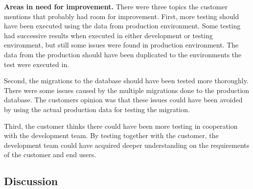 \textbf{Areas in need for improvement.} There were three topics the customer mentions that probably had room for improvement. First, more testing should have been executed using the data from production environment. Some testing had successive results when executed in either development or testing environment, but still some issues were found in production environment. The data from the production should have been duplicated to the environments the test were executed in.

Second, the migrations to the database should have been tested more thoroughly. There were some issues caused by the multiple migrations done to the production database. The customers opinion was that these issues could have been avoided by using the actual production data for testing the migration.

Third, the customer thinks there could have been more testing in cooperation with the development team. By testing together with the customer, the development team could have acquired deeper understanding on the requirements of the customer and end users.


\subsection{Discussion}

